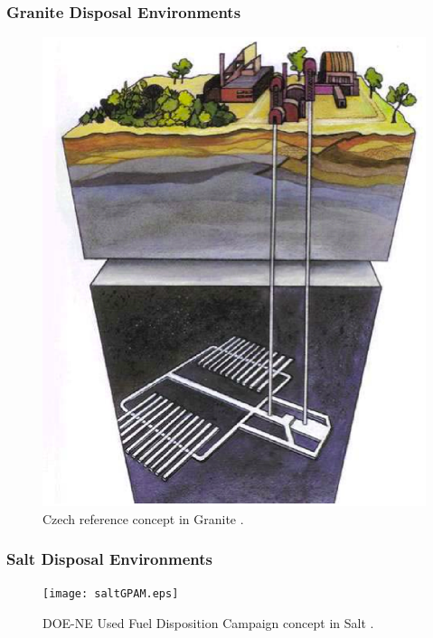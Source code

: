 \begin{frame}[ctb!]
  \frametitle{Granite Disposal Environments}
  \footnotesize{

  \begin{figure}[h!]
    \begin{center}
      \includegraphics[height=.7\textheight]{czechGraniteRedImp.eps}
    \end{center}
    \caption{Czech reference concept in Granite 
    \cite{von_lensa_red-impact_2008}.}
    \label{fig:czechGraniteRedImp}
  \end{figure}
}
\end{frame}

\begin{frame}[ctb!]
  \frametitle{Salt Disposal Environments}
  \footnotesize{

  \begin{figure}[h!]
    \begin{center}
      \texttt{[image: saltGPAM.eps]}
    \end{center}
    \caption{DOE-NE Used Fuel Disposition Campaign  concept in 
    Salt \cite{clayton_generic_2011}.}
    \label{fig:saltGPAM}
  \end{figure}
}
\end{frame}

